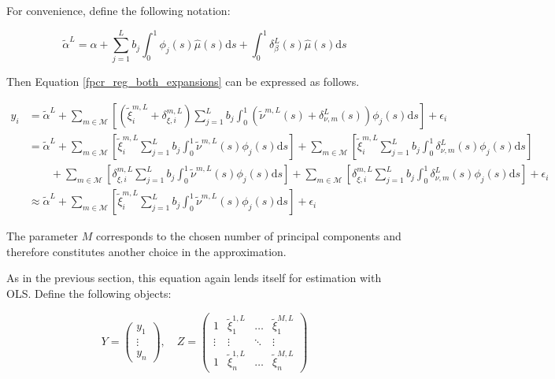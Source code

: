 \documentclass[11pt,twoside,a4paper]{article}
\begin{document}
	For convenience, define the following notation:
	
	\begin{equation}
		\tilde{\alpha}^L = \alpha + \sum_{j = 1}^{L} b_j \int_{0}^{1} \phi_j(s) \hat{\mu}(s) \mathrm{d}s + \int_{0}^{1} \delta_{\beta}^{L}(s) \hat{\mu}(s) \mathrm{d}s
	\end{equation}
	
	Then Equation \ref{fpcr_reg_both_expansions} can be expressed as follows.
	
	\begin{equation}
		\begin{split}
			y_i & = \tilde{\alpha}^L
			+ \sum_{m \in \mathcal{M}} \left[ \left(\tilde{\xi}^{m,L}_{i} + \delta_{\xi, i}^{m, L} \right) \sum_{j = 1}^{L} b_j \int_{0}^{1} \left(\tilde{\nu}^{m,L}(s) + \delta_{\nu, m}^L(s) \right) \phi_j(s) \mathrm{d}s \right] 
			+ \epsilon_i \\
			& = \tilde{\alpha}^L
			+ \sum_{m \in \mathcal{M}} \left[ \tilde{\xi}^{m,L}_{i} \sum_{j = 1}^{L} b_j \int_{0}^{1} \tilde{\nu}^{m,L}(s) \phi_j(s) \mathrm{d}s \right] 
			+ \sum_{m \in \mathcal{M}} \left[ \tilde{\xi}^{m,L}_{i} \sum_{j = 1}^{L} b_j \int_{0}^{1} \delta_{\nu, m}^L(s) \phi_j(s) \mathrm{d}s \right] \\
			& \quad \quad + \sum_{m \in \mathcal{M}} \left[ \delta_{\xi, i}^{m, L} \sum_{j = 1}^{L} b_j \int_{0}^{1} \tilde{\nu}^{m,L}(s) \phi_j(s) \mathrm{d}s \right] 
			+ \sum_{m \in \mathcal{M}} \left[ \delta_{\xi, i}^{m, L} \sum_{j = 1}^{L} b_j \int_{0}^{1} \delta_{\nu, m}^L(s) \phi_j(s) \mathrm{d}s \right]
			+ \epsilon_i \\
			& \approx \tilde{\alpha}^L
			+ \sum_{m \in \mathcal{M}} \left[ \tilde{\xi}^{m,L}_{i} \sum_{j = 1}^{L} b_j \int_{0}^{1} \tilde{\nu}^{m,L}(s) \phi_j(s) \mathrm{d}s \right] + \epsilon_i
		\end{split}
	\end{equation}

	The parameter $M$ corresponds to the chosen number of principal components and therefore constitutes another choice in the approximation.

	As in the previous section, this equation again lends itself for estimation with OLS. Define the following objects:
	
	\begin{equation}
		Y = \begin{pmatrix}
			y_1 \\ \vdots \\ y_n
		\end{pmatrix}, \quad
		Z = \begin{pmatrix}
			1 & \tilde{\xi}^{1,L}_{1} & \dots & \tilde{\xi}^{M,L}_{1} \\
			\vdots & \vdots & \ddots & \vdots \\
			1 & \tilde{\xi}^{1,L}_{n} & \dots & \tilde{\xi}^{M,L}_{n}
		\end{pmatrix}
	\end{equation}
	
\end{document}
